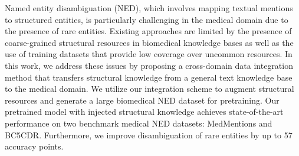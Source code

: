 Named entity disambiguation (NED), which involves mapping textual mentions to structured entities, is particularly challenging in the medical domain due to the presence of rare entities. Existing approaches are limited by the presence of coarse-grained structural resources in biomedical knowledge bases as well as the use of training datasets that provide low coverage over uncommon resources. In this work, we address these issues by proposing a cross-domain data integration method that transfers structural knowledge from a general text knowledge base to the medical domain. We utilize our integration scheme to augment structural resources and generate a large biomedical NED dataset for pretraining. Our pretrained model with injected structural knowledge achieves state-of-the-art performance on two benchmark medical NED datasets: MedMentions and BC5CDR. Furthermore, we improve disambiguation of rare entities by up to 57 accuracy points.
